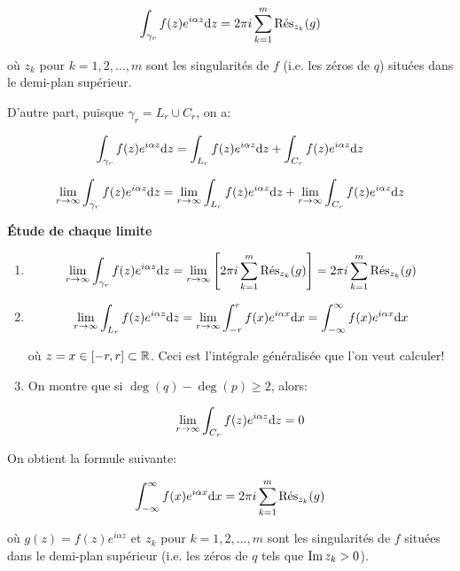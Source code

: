 \begin{enumerate}
\[ \int_{\gamma_r} f(z) e^{i\alpha z} \dz = 2\pi i \sum_{k = 1}^m \Res_{z_k}(g) \]

où $z_k$ pour $k = 1, 2, \ldots, m$ sont les singularités de $f$ (i.e. les zéros de $q$) situées dans le demi-plan supérieur.

D'autre part, puisque $\gamma_r = L_r \cup C_r$, on a:

\[ \int_{\gamma_r} f(z) e^{i\alpha z} \dz = \int_{L_r} f(z) e^{i\alpha z} \dz + \int_{C_r} f(z) e^{i\alpha z} \dz \]

\[ \lim_{r \rightarrow \infty} \int_{\gamma_r} f(z) e^{i\alpha z} \dz
= \lim_{r \rightarrow \infty} \int_{L_r} f(z) e^{i\alpha z} \dz
+ \lim_{r \rightarrow \infty} \int_{C_r} f(z) e^{i\alpha z} \dz \]

\textbf{Étude de chaque limite}

\begin{enumerate}
    \item
    
    \[
        \lim_{r \rightarrow \infty} \int_{\gamma_r} f(z) e^{i\alpha z} \dz
        = \lim_{r \rightarrow \infty} \left[ 2\pi i \sum_{k = 1}^m \Res_{z_k}(g) \right]
        = 2\pi i \sum_{k = 1}^m \Res_{z_k}(g)
    \]
    
    \item 
    
    \[
        \lim_{r \rightarrow \infty} \int_{L_r} f(z) e^{i\alpha z} \dz
        = \lim_{r \rightarrow \infty} \int_{-r}^r f(x) e^{i\alpha x} \dx
        = \int_{-\infty}^\infty f(x) e^{i\alpha x} \dx
    \]
    
    où $z = x \in [-r, r] \subset \R$.
    Ceci est l'intégrale généralisée que l'on veut calculer!
    
    \item On montre que si $\deg(q) - \deg(p) \geq 2$, alors:
    
    \[
        \lim_{r \rightarrow \infty} \int_{C_r} f(z) e^{i\alpha z} \dz = 0
    \]
\end{enumerate}

\begin{result}[final]
    On obtient la formule suivante:
    
    \[ \int_{-\infty}^\infty f(x) e^{i\alpha x} \dx
    = 2\pi i \sum_{k = 1}^m \Res_{z_k}(g) \]
    
    où $g(z) = f(z)e^{i\alpha z}$ et $z_k$ pour $k = 1, 2, \ldots, m$ sont les singularités de $f$ situées dans le demi-plan supérieur (i.e. les zéros de $q$ tels que $\Imp z_k > 0$).
\end{result}


\end{enumerate}
